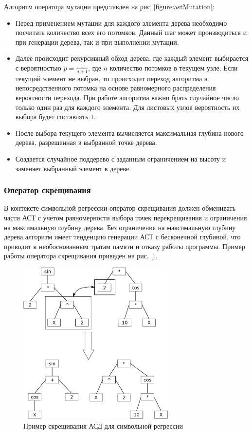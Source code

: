 Алгоритм оператора мутации представлен на рис~\ref{figure:astMutation}:
\begin{itemize}
\item Перед применением мутации для каждого элемента дерева необходимо посчитать количество всех его потомков. Данный шаг может производиться и при генерации дерева, так и при выполнении мутации.
\item Далее происходит рекурсивный обход дерева, где каждый элемент выбирается с вероятностью $p = \frac{1}{n+1}$, где $n$ количество потомков в текущем узле. Если текущий элемент не выбран, то происходит переход алгоритма в непосредственного потомка на основе равномерного распределения вероятности перехода. При работе алгоритма важно брать случайное число только один раз для каждого элемента. Для листовых узлов вероятность их выбора будет составлять $1$.
\item После выбора текущего элемента вычисляется максимальная глубина нового дерева, разрешенная в выбранной точке дерева.
\item Создается случайное поддерево с заданным ограничением на высоту и заменяет выбранный элемент в дереве.
\end{itemize}

\clearpage
\subsubsection{Оператор скрещивания}

В контексте символьной регрессии оператор скрещивания должен обменивать части АСТ с учетом равномерности выбора точек перекрещивания и ограничения на максимальную глубину дерева. Без ограничения на максимальную глубину дерева алгоритм имеет тенденцию генерации АСТ с бесконечной глубиной, что приводит к необоснованным тратам памяти и отказу работы программы. Пример работы оператора скрещивания приведен на рис.~\ref{figure:astCrossoverExample}.

\begin{figure}[h!]
\centering
\includegraphics[width=0.7\textwidth]{science/ast_crossover_example}
\caption{Пример скрещивания АСД для символьной регрессии}
\label{figure:astCrossoverExample}
\end{figure}

